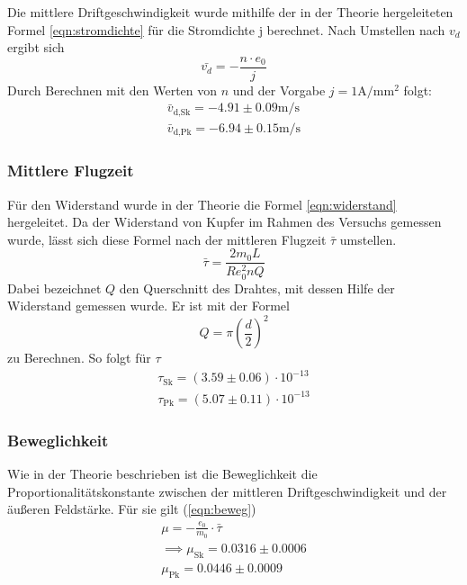 Die mittlere Driftgeschwindigkeit wurde mithilfe der in der Theorie hergeleiteten
Formel \eqref{eqn:stromdichte} für die Stromdichte j  berechnet. Nach Umstellen nach $v_d$ ergibt sich
\begin{equation*}
\bar{v_d} = - \frac{n \cdot e_0}{j} 
\end{equation*}
Durch Berechnen mit den Werten von $n$ und der Vorgabe $j = 1 \si{\ampere\per\milli\meter\squared}$
folgt:
\begin{align*}
\bar{v}_\text{d,Sk} = -4.91 \pm 0.09 \si{\m\per\s}\\
\bar{v}_\text{d,Pk} = -6.94 \pm 0.15 \si{\m\per\s}
\end{align*}

\subsubsection{Mittlere Flugzeit}

Für den Widerstand wurde in der Theorie die Formel \eqref{eqn:widerstand} hergeleitet. Da der Widerstand
von Kupfer im Rahmen des Versuchs gemessen wurde, lässt sich diese Formel nach
der mittleren Flugzeit $\bar{\tau}$ umstellen.
\begin{equation*}
\bar{\tau} = \frac{2 m_0 L}{R e_0^2 n Q}
\end{equation*}
Dabei bezeichnet $Q$ den Querschnitt des Drahtes, mit dessen Hilfe der Widerstand gemessen wurde.
Er ist mit der Formel
\begin{equation}
Q = \pi \left( \frac{d}{2} \right)^2
\end{equation}
zu Berechnen. So folgt für $\tau$
\begin{align*}
\tau_\text{Sk} = \left( 3.59 \pm 0.06 \right) \cdot 10^{-13}\\
\tau_\text{Pk} = \left( 5.07 \pm 0.11 \right) \cdot 10^{-13}
\end{align*}

\subsubsection{Beweglichkeit}

Wie in der Theorie beschrieben ist die Beweglichkeit die Proportionalitätskonstante zwischen 
der mittleren Driftgeschwindigkeit und der äußeren Feldstärke. Für sie gilt (\eqref{eqn:beweg})
\begin{align*}
\mu = -\frac{e_0}{m_0} \cdot \bar{\tau} \\
\implies \mu_\text{Sk} = 0.0316 \pm 0.0006 \\
\mu_\text{Pk} = 0.0446 \pm 0.0009
\end{align*}

